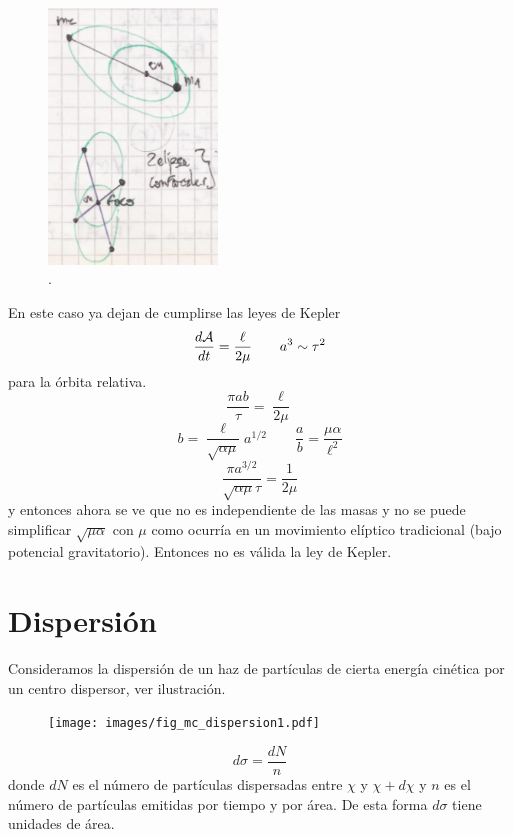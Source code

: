 \documentclass[10pt,oneside]{CBFT_book}
\begin{document}
\begin{figure}[hbt]
	\begin{center}
	\includegraphics[width=0.4\textwidth]{images/fig_mc_elipses_confocales.pdf}	 
	\end{center}
	\caption{.}
	\label{fig_mc_elipses_confocales}
\end{figure} 

En este caso ya dejan de cumplirse las leyes de Kepler
\[
	\frac{d^{\hspace{-0.05em}} {\mathcal{A}}}{d {t}^{\hspace{-0.05em}}} = \frac{\ell}{2\mu} \qquad a^3 \sim \tau^2 
\]
para la órbita relativa.
\[
	\frac{\pi a b }{\tau}= \frac{\ell}{2\mu} 
\]
\[
	b = \frac{\ell}{\sqrt{\alpha \mu}} a^{1/2} \qquad \frac{a}{b} = \frac{\mu \alpha}{\ell^2}
\]
\[
	\frac{\pi a^{3/2}}{\sqrt{\alpha \mu} \tau} = \frac{1}{2\mu}
\]
y entonces ahora se ve que no es independiente de las masas y no se puede simplificar $\sqrt{\mu\alpha}$ con
$\mu$ como ocurría en un movimiento elíptico tradicional (bajo potencial gravitatorio).
Entonces no es válida la ley de Kepler.
\section{Dispersión}

Consideramos la dispersión de un haz de partículas de cierta energía cinética por un centro dispersor,
ver ilustración.

\begin{figure}[htb]
	\begin{center}
	\texttt{[image: images/fig\_mc\_dispersion1.pdf]}	 
	\end{center}
	\caption{}
\end{figure} 
\[
	d\sigma = \frac{dN}{n}
\]
donde $dN$ es el número de partículas dispersadas entre $\chi$ y $\chi + d\chi$ y $n$ es el número de
partículas emitidas por tiempo y por área. De esta forma $d\sigma$ tiene unidades de área.
\end{document}
